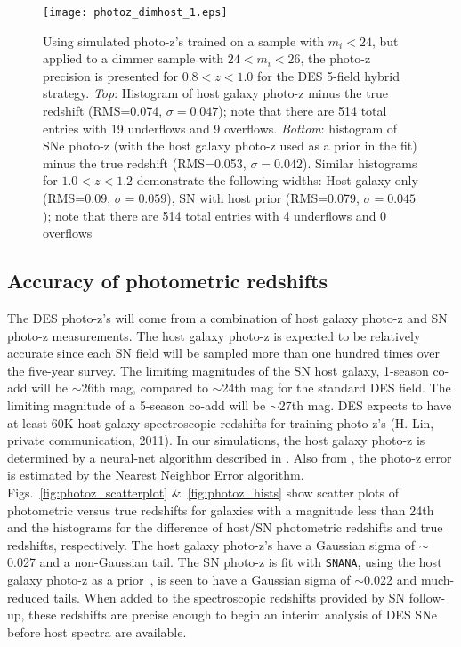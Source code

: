 \documentclass[preprint2]{aastex}    %
\newcommand{\snana}{{\tt SNANA}}
\begin{document}
\begin{figure}[ht]
\centerline{\texttt{[image: photoz\_dimhost\_1.eps]}}
\caption{Using simulated photo-z's trained on a sample with $m_i<24$, but 
applied to a dimmer sample with $24<m_i<26$, the photo-z precision is 
presented for $0.8<z<1.0$ for the DES 5-field hybrid strategy. 
\textit{Top}: Histogram of host galaxy photo-z minus the true 
redshift (RMS=0.074, $\sigma=0.047$); note that there are 514 total entries with 19 underflows and 9 overflows. \textit{Bottom}: histogram of SNe photo-z (with the host 
galaxy photo-z used as a prior in the fit) minus the true redshift (RMS=0.053, $\sigma=0.042$).
Similar histograms for $1.0<z<1.2$ demonstrate the following widths: 
Host galaxy only (RMS=0.09, $\sigma=0.059$), SN with host prior 
(RMS=0.079, $\sigma=0.045$);  note that there are 514 total entries with 4 underflows and 0 overflows}
\label{fig:photoz_dimhosts}
\end{figure}

\subsection{Accuracy of photometric redshifts}
The DES photo-z's will come from a combination of host galaxy photo-z 
and SN photo-z measurements. The host galaxy photo-z is expected to be 
relatively accurate since each SN field will be sampled more than one 
hundred times over the five-year survey. The limiting magnitudes of the
SN host galaxy, 1-season co-add will be $\sim$26th mag, compared to 
$\sim$24th mag for the standard DES field. The limiting 
magnitude of a 5-season co-add will be $\sim$27th mag. 
DES expects to have at least 60K host galaxy spectroscopic redshifts 
for training photo-z's (H. Lin, private communication, 2011). In our simulations, the host galaxy photo-z is 
determined by a neural-net algorithm described in \cite{oya08}. Also from \cite{oya08}, 
the photo-z error is estimated by the Nearest Neighbor Error algorithm.
Figs.~\ref{fig:photoz_scatterplot} \&~\ref{fig:photoz_hists} show scatter 
plots of photometric versus true redshifts for galaxies with a magnitude less than 24th and the 
histograms for the difference of host/SN photometric redshifts and true redshifts, 
respectively. The host galaxy photo-z's have a Gaussian sigma of $\sim$0.027 and 
a non-Gaussian tail. The SN photo-z is fit with \snana, using the host galaxy photo-z 
as a prior~\citep{kes10}, is seen to have a Gaussian sigma of $\sim$0.022 and much-reduced 
tails. When added to the spectroscopic redshifts provided by SN follow-up, these 
redshifts are precise enough to begin an interim analysis of 
DES SNe before host spectra are available.
\end{document}
